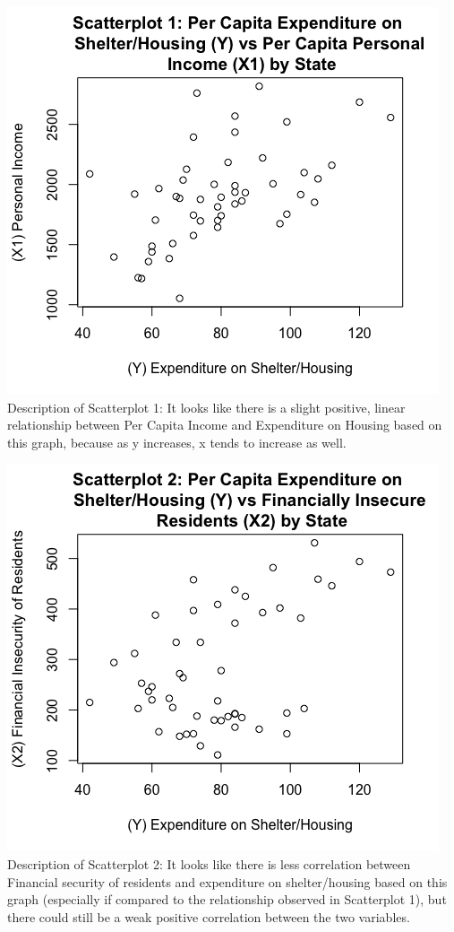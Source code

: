 \documentclass[12pt,letterpaper]{article}
\begin{document}
\begin{itemize}
		\begin{center}	
		\includegraphics[scale=.80]{Scatterplot1.png}
		Description of Scatterplot 1: It looks like there is a slight positive, linear relationship between Per Capita Income and Expenditure on Housing based on this graph, because as y increases, x tends to increase as well.
		\end{center}
	
		\newpage	
		 
	
		\begin{center}
		\includegraphics[scale=.80]{Scatterplot2.png}
		Description of Scatterplot 2: It looks like there is less correlation between Financial security of residents and expenditure on shelter/housing based on this graph (especially if compared to the relationship observed in Scatterplot 1), but there could still be a weak positive correlation between the two variables.
		\end{center}
	

\end{itemize}
\end{document}
